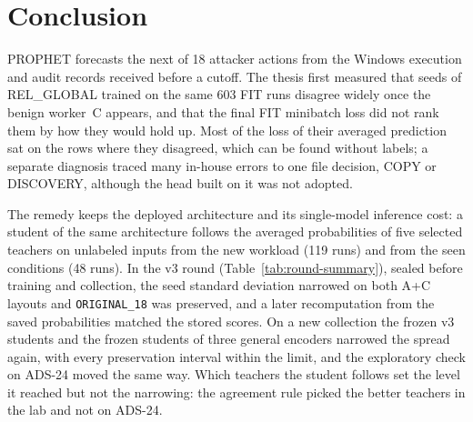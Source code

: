 \chapter{Conclusion}
\label{ch:conclusion}

PROPHET forecasts the next of 18 attacker actions from the Windows
execution and audit records received before a cutoff. The thesis
first measured that seeds of REL\_GLOBAL trained on the same 603 FIT
runs disagree widely once the benign worker~C appears, and that the
final FIT minibatch loss did not rank them by how they would hold up.
Most of the loss of their averaged prediction sat on the
rows where they disagreed, which can be found without labels; a separate diagnosis traced many
in-house errors to one file decision, COPY or DISCOVERY, although the
head built on it was not adopted.

The remedy keeps the deployed architecture and its single-model
inference cost: a student of the same
architecture follows the averaged
probabilities of five selected teachers on unlabeled inputs from the
new workload (119 runs) and from the seen conditions (48 runs). In the
v3 round (Table~\ref{tab:round-summary}), sealed before training and
collection, the seed standard deviation narrowed on both A+C layouts
and \texttt{ORIGINAL\_18} was preserved, and a later recomputation from
the saved probabilities matched the stored scores. On a new collection
the frozen v3 students and the frozen students of three general
encoders narrowed the spread again, with every preservation interval
within the limit, and the exploratory check on ADS-24 moved the same
way. Which teachers the student follows set the level it reached but
not the narrowing: the agreement rule picked the better teachers in the
lab and not on ADS-24.

